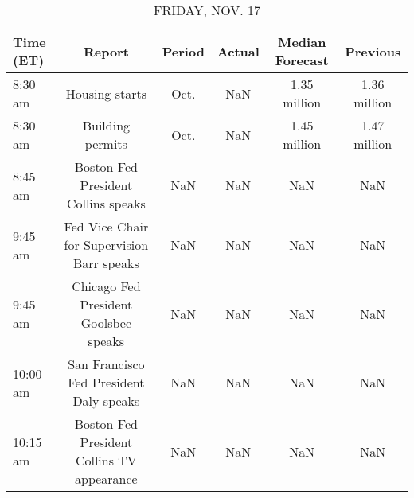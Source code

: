 \documentclass{article}%
\begin{document}
%


\begin{table}[htbp]%
\caption{FRIDAY, NOV. 17}%
\centering%
\begin{adjustbox}{width=1\textwidth}%
\begin{tabular}{lccccc}
\toprule
Time (ET) &                                     Report & Period & Actual & Median Forecast &     Previous \\
\midrule
  8:30 am &                             Housing starts &   Oct. &    NaN &    1.35 million & 1.36 million \\
  8:30 am &                           Building permits &   Oct. &    NaN &    1.45 million & 1.47 million \\
  8:45 am &        Boston Fed President Collins speaks &    NaN &    NaN &             NaN &          NaN \\
  9:45 am & Fed Vice Chair for Supervision Barr speaks &    NaN &    NaN &             NaN &          NaN \\
  9:45 am &      Chicago Fed President Goolsbee speaks &    NaN &    NaN &             NaN &          NaN \\
 10:00 am &    San Francisco Fed President Daly speaks &    NaN &    NaN &             NaN &          NaN \\
 10:15 am & Boston Fed President Collins TV appearance &    NaN &    NaN &             NaN &          NaN \\
\bottomrule
\end{tabular}
%
\end{adjustbox}%
\end{table}
\end{document}
